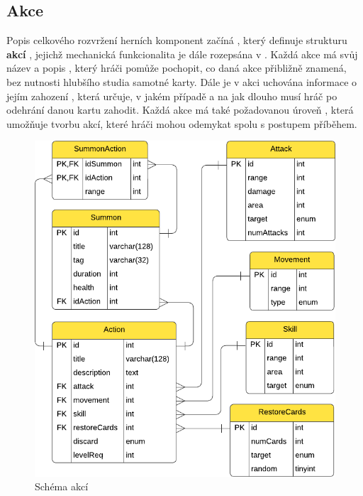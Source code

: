 \subsection{Akce}
\label{subsec:schema_actions}

Popis celkového rozvržení herních komponent začíná , který definuje strukturu \textbf{akcí} , jejichž mechanická funkcionalita je dále rozepsána v . Každá akce má svůj název  a popis , který hráči pomůže pochopit, co daná akce přibližně znamená, bez nutnosti hlubšího studia samotné karty. Dále je v akci uchována informace o jejím zahození , která určuje, v jakém případě a na jak dlouho musí hráč po odehrání danou kartu zahodit. Každá akce má také požadovanou úroveň , která umožňuje tvorbu akcí, které hráči mohou odemykat spolu s postupem příběhem.

\begin{figure}[h]
    \centering
    \includegraphics{../../shared/diagrams/er_action.pdf}
    \caption{Schéma akcí}
    \label{diag:er_action}
\end{figure}

